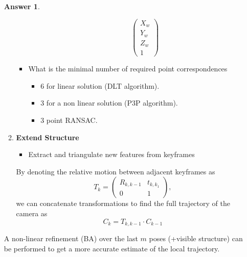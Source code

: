 \documentclass[a4paper,12 pt]{article}
\theoremstyle{definition}
\theoremstyle{remark}
\theoremstyle{definition}
\theoremstyle{definition}
\theoremstyle{definition}
\theoremstyle{definition}
\theoremstyle{remark}
\theoremstyle{remark}
\theoremstyle{definition}
\theoremstyle{definition}
\newtheorem*{answer}{Answer}
\begin{document}
\begin{enumerate}
\begin{answer}
\begin{enumerate}
\begin{itemize}
\begin{itemize}
\begin{equation}
\begin{pmatrix}
 X_w\\
 Y_w\\
 Z_w\\
 1
 \end{pmatrix}
 \end{equation}
\end{itemize}
 \item What is the minimal number of required point correspondences
\begin{itemize}
\item 6 for linear solution (DLT algorithm).
\item 3 for a non linear solution (P3P algorithm).
\item 3 point RANSAC.
\end{itemize}
\end{itemize}
\item \textbf{Extend Structure}
\begin{itemize}
\item Extract and triangulate new features from keyframes
\end{itemize}
By denoting the relative motion between adjacent keyframes as
\begin{equation}
T_k=\begin{pmatrix}
R_{k,k-1}&t_{k,k_1}\\
0&1
\end{pmatrix},
\end{equation}
we can concatenate transformations to find the full trajectory of the camera as
\begin{equation}
C_k=T_{k,k-1}\cdot C_{k-1}
\end{equation}
\end{enumerate}
A non-linear refinement (BA) over the last $m$ poses (+visible structure) can be performed to get a more accurate estimate of the local trajectory. 
\end{answer}


\end{enumerate}
\end{document}
